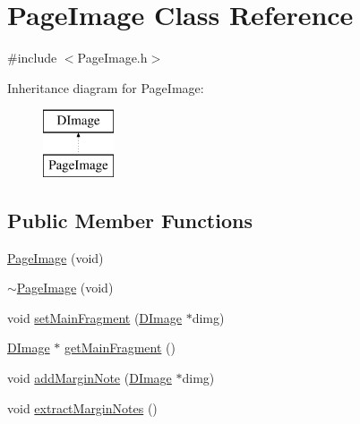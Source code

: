 \hypertarget{class_page_image}{\section{Page\+Image Class Reference}
\label{class_page_image}
}


{\ttfamily \#include $<$Page\+Image.\+h$>$}

Inheritance diagram for Page\+Image\+:\begin{figure}[H]
\begin{center}
\leavevmode
\includegraphics[height=2.000000cm]{class_page_image}
\end{center}
\end{figure}
\subsection*{Public Member Functions}
\begin{DoxyCompactItemize}
\item 
\hyperlink{class_page_image_acd6291149a801930fe85801780a480a1}{Page\+Image} (void)
\item 
\hyperlink{class_page_image_a3a5b95965ac1d84f71c5ba3ee4890558}{$\sim$\+Page\+Image} (void)
\item 
void \hyperlink{class_page_image_a8fb57e9c831783972f64a1befe0eb108}{set\+Main\+Fragment} (\hyperlink{class_d_image}{D\+Image} $\ast$dimg)
\item 
\hyperlink{class_d_image}{D\+Image} $\ast$ \hyperlink{class_page_image_ae865d0cb7d4c1f51ed70180bd2e9894f}{get\+Main\+Fragment} ()
\item 
void \hyperlink{class_page_image_aa06ea24ceaca41d73bb12062a5c806eb}{add\+Margin\+Note} (\hyperlink{class_d_image}{D\+Image} $\ast$dimg)
\item 
void \hyperlink{class_page_image_a8c59ffb28ca315cef488b54bd4901f7c}{extract\+Margin\+Notes} ()
\end{DoxyCompactItemize}


